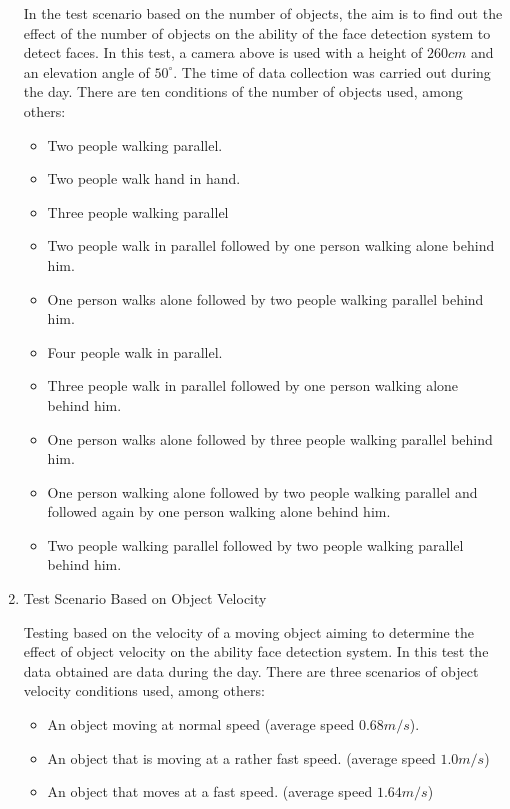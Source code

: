 \begin{enumerate}
  In the test scenario based on the number of objects, the aim is to find out
  the effect of the number of objects on the ability of the face detection system to detect faces.
  In this test, a camera above is used with a height of $260 cm$ and an elevation angle of $50^\circ$.
  The time of data collection was carried out during the day.
  There are ten conditions of the number of objects used,
  among others:

  \begin{itemize}
    \item Two people walking parallel.
    \item Two people walk hand in hand.
    \item Three people walking parallel
    \item Two people walk in parallel followed by one person walking alone behind him.
    \item One person walks alone followed by two people walking parallel behind him.
    \item Four people walk in parallel.
    \item Three people walk in parallel followed by one person walking alone behind him.
    \item One person walks alone followed by three people walking parallel behind him.
    \item One person walking alone followed by two people walking parallel and followed again by
    one person walking alone behind him.
    \item Two people walking parallel followed by two people walking parallel behind him.
  \end{itemize}

  \item Test Scenario Based on Object Velocity
  
  Testing based on the velocity of a moving object aiming
  to determine the effect of object velocity on the ability
  face detection system. In this test the data obtained are
  data during the day. There are three scenarios of object velocity conditions used,
  among others:

  \begin{itemize}
    \item An object moving at normal speed (average speed $0.68 m/s$).
    \item An object that is moving at a rather fast speed. (average speed $1.0 m/s$)
    \item An object that moves at a fast speed. (average speed $1.64 m/s$)
  \end{itemize}
  

\end{enumerate}
